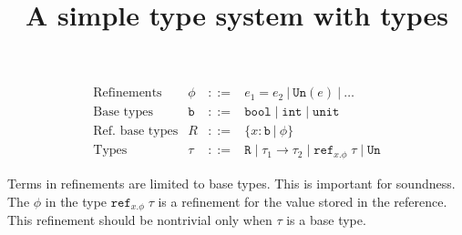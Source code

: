 \documentclass[a4paper,11pt]{article}
\title{A simple type system with {\tun} types}
\date{}
\newcommand{\type}[1]{\ensuremath{\mathtt{#1}}}
\newcommand{\tun}{\type{Un}}
\newcommand{\tbase}{\type{b}}
\newcommand{\tbref}{\type{R}}
\newcommand{\tbool}{\type{bool}}
\newcommand{\tint}{\type{int}}
\newcommand{\tunit}{\type{unit}}
\newcommand{\tref}[2]{\type{ref}_{#2}\;#1}
\newcommand{\peq}[2]{#1 = #2}
\newcommand{\pun}[1]{\type{Un}(#1)}
\newcommand{\sep}{\;|\;}
\begin{document}
\maketitle

\[
\begin{array}{llll}
\mbox{Refinements} & \phi & ::= & \peq{e_1}{e_2} ~|~ \pun{e} ~|~ \ldots  \\
  \mbox{Base types} & \tbase & ::= & \tbool \sep \tint \sep \tunit \\
\mbox{Ref.\ base types} & R & ::= & \{x : \tbase ~|~ \phi\}\\
  
  \mbox{Types} & \tau & ::= & \tbref \sep \tau_1 \to \tau_2 \sep \tref{\tau}{x.\phi} \sep \tun  
\end{array}
\]

Terms in refinements are limited to base types. This is important for
soundness. The $\phi$ in the type $\tref{\tau}{x.\phi}$ is a
refinement for the value stored in the reference. This refinement
should be nontrivial only when $\tau$ is a base type.
\end{document}
